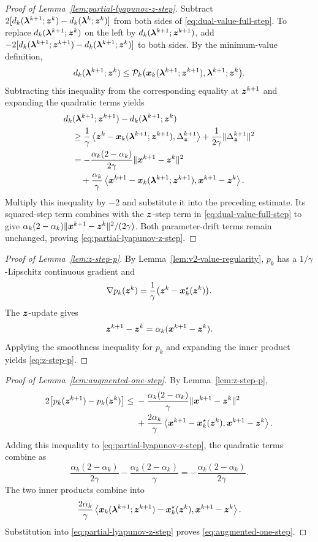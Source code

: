 \begin{proof}[Proof of Lemma~\ref{lem:partial-lyapunov-z-step}]
Subtract
$2[d_k(\bm{\lambda}^{k+1};\bm{z}^k)-d_k(\bm{\lambda}^k;\bm{z}^k)]$
from both sides of \eqref{eq:dual-value-full-step}. To replace
$d_k(\bm{\lambda}^{k+1};\bm{z}^k)$ on the left by
$d_k(\bm{\lambda}^{k+1};\bm{z}^{k+1})$, add
$-2[d_k(\bm{\lambda}^{k+1};\bm{z}^{k+1})-d_k(\bm{\lambda}^{k+1};\bm{z}^k)]$
to both sides.
By the minimum-value definition,
\[
d_k(\bm{\lambda}^{k+1};\bm{z}^k)
\le
\mathcal P_k\bigl(\bm{x}_k(\bm{\lambda}^{k+1};\bm{z}^{k+1}),
\bm{\lambda}^{k+1};\bm{z}^k\bigr).
\]
Subtracting this inequality from the corresponding equality at
$\bm{z}^{k+1}$ and expanding the quadratic terms yields
\[
\begin{aligned}
&d_k(\bm{\lambda}^{k+1};\bm{z}^{k+1})-d_k(\bm{\lambda}^{k+1};\bm{z}^k) \\
&\quad\ge
\frac1\gamma\left\langle
\bm{z}^k-\bm{x}_k(\bm{\lambda}^{k+1};\bm{z}^{k+1}),
\Delta_{\bm{z}}^{k+1}\right\rangle
+\frac1{2\gamma}\|\Delta_{\bm{z}}^{k+1}\|^2 \\
&\quad=
-\frac{\alpha_k(2-\alpha_k)}{2\gamma}
\|\bm{x}^{k+1}-\bm{z}^k\|^2 \\
&\qquad+
\frac{\alpha_k}{\gamma}\left\langle
\bm{x}^{k+1}-\bm{x}_k(\bm{\lambda}^{k+1};\bm{z}^{k+1}),
\bm{x}^{k+1}-\bm{z}^k\right\rangle.
\end{aligned}
\]
Multiply this inequality by $-2$ and substitute it into the preceding
estimate. Its squared-step term combines with the $\bm{z}$-step term in
\eqref{eq:dual-value-full-step} to give
$\alpha_k(2-\alpha_k)\|\bm{x}^{k+1}-\bm{z}^k\|^2/(2\gamma)$.
Both parameter-drift terms remain unchanged, proving
\eqref{eq:partial-lyapunov-z-step}.
\end{proof}

\begin{proof}[Proof of Lemma~\ref{lem:z-step-p}]
By Lemma~\ref{lem:v2-value-regularity}, $p_k$ has a
$1/\gamma$-Lipschitz continuous gradient and
\[
    \nabla p_k(\bm{z}^k)
    =
    \frac1\gamma\bigl(\bm{z}^k-\bm{x}_k^\star(\bm{z}^k)\bigr).
\]
The $\bm{z}$-update gives
\[
    \bm{z}^{k+1}-\bm{z}^k
    =\alpha_k(\bm{x}^{k+1}-\bm{z}^k).
\]
Applying the smoothness inequality for $p_k$ and expanding the inner
product yields \eqref{eq:z-step-p}.
\end{proof}

\begin{proof}[Proof of Lemma~\ref{lem:augmented-one-step}]
By Lemma~\ref{lem:z-step-p},
\begin{equation}
\begin{aligned}
2\bigl[p_k(\bm{z}^{k+1})-p_k(\bm{z}^k)\bigr]
\le{}&
-\frac{\alpha_k(2-\alpha_k)}{\gamma}
\|\bm{x}^{k+1}-\bm{z}^k\|^2 \\
&+
\frac{2\alpha_k}{\gamma}
\left\langle
\bm{x}^{k+1}-\bm{x}_k^\star(\bm{z}^k),
\bm{x}^{k+1}-\bm{z}^k
\right\rangle.
\end{aligned}
\end{equation}
Adding this inequality to
\eqref{eq:partial-lyapunov-z-step}, the quadratic terms combine as
\[
\frac{\alpha_k(2-\alpha_k)}{2\gamma}
-\frac{\alpha_k(2-\alpha_k)}{\gamma}
=
-\frac{\alpha_k(2-\alpha_k)}{2\gamma}.
\]
The two inner products combine into
\[
\frac{2\alpha_k}{\gamma}
\left\langle
\bm{x}_k(\bm{\lambda}^{k+1};\bm{z}^{k+1})
-\bm{x}_k^\star(\bm{z}^k),
\bm{x}^{k+1}-\bm{z}^k
\right\rangle.
\]
Substitution into \eqref{eq:partial-lyapunov-z-step} proves
\eqref{eq:augmented-one-step}.
\end{proof}

